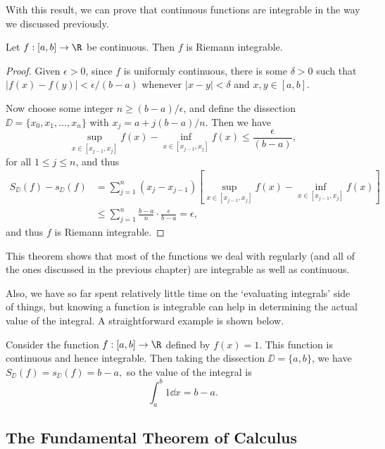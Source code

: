 With this result, we can prove that continuous functions are integrable in the way we discussed previously.


\begin{theorem}
	Let $f:[a, b] \rightarrow \R$ be continuous. Then $f$ is Riemann integrable.
\end{theorem}
\begin{proof}
	Given $\epsilon > 0$, since $f$ is uniformly continuous, there is some $\delta > 0$ such that $|f(x) - f(y)| < \epsilon/(b - a)$ whenever $|x - y| < \delta$ and $x, y \in [a, b]$.

	Now choose some integer $n \geq (b - a)/\epsilon$, and define the dissection $\DD = \{x_0, x_1, \dots, x_n\}$ with $x_j = a + j(b - a)/n$. Then we have
	$$
	\sup_{x \in [x_{j - 1}, x_j]} f(x) - \inf_{x \in [x_{j - 1}, x_j]} f(x) \leq \frac{\epsilon}{(b - a)},
	$$
	for all $1 \leq j \leq n$, and thus 
	\begin{align*}
		S_\DD(f) - s_\DD(f) &= \sum_{j = 1}^n (x_j - x_{j - 1})\left[\sup_{x \in [x_{j - 1}, x_j]} f(x) - \inf_{x \in [x_{j - 1}, x_j]} f(x)\right] \\
		&\leq \sum_{j = 1}^n \frac{b - a}{n} \cdot \frac{\epsilon}{b - a} = \epsilon,
	\end{align*}
	and thus $f$ is Riemann integrable.
\end{proof}

This theorem shows that most of the functions we deal with regularly (and all of the ones discussed in the previous chapter) are integrable as well as continuous.


Also, we have so far spent relatively little time on the `evaluating integrals' side of things, but knowing a function is integrable can help in determining the actual value of the integral. A straightforward example is shown below.

\begin{example}[Integral of $f(x) = 1$]
	Consider the function $f:[a, b] \rightarrow \R$ defined by $f(x) = 1$. This function is continuous and hence integrable. Then taking the dissection $\DD = \{a, b\}$, we have
	$
	S_{\DD}(f) = s_{\DD}(f) = b - a,
	$ so the value of the integral is
	$$
	\int_a^b 1 \dd x = b - a.
	$$
\end{example}


\subsection{The Fundamental Theorem of Calculus}


